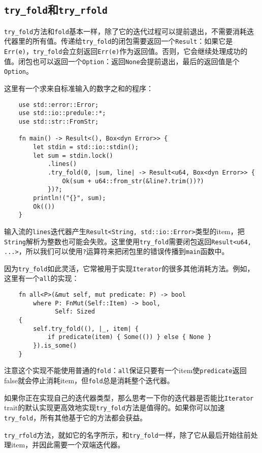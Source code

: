\subsection{\texttt{try\_fold}和\texttt{try\_rfold}}
\texttt{try\_fold}方法和\texttt{fold}基本一样，除了它的迭代过程可以提前退出，不需要消耗迭代器里的所有值。传递给\texttt{try\_fold}的闭包需要返回一个\texttt{Result}：如果它是\texttt{Err(e)}，\texttt{try\_fold}会立刻返回\texttt{Err(e)}作为返回值。否则，它会继续处理成功的值。闭包也可以返回一个\texttt{Option}：返回\texttt{None}会提前退出，最后的返回值是个\texttt{Option}。

这里有一个求来自标准输入的数字之和的程序：
\begin{verbatim}
    use std::error::Error;
    use std::io::predule::*;
    use std::str::FromStr;

    fn main() -> Result<(), Box<dyn Error>> {
        let stdin = std::io::stdin();
        let sum = stdin.lock()
            .lines()
            .try_fold(0, |sum, line| -> Result<u64, Box<dyn Error>> {
                Ok(sum + u64::from_str(&line?.trim())?)
            })?;
        println!("{}", sum);
        Ok(())
    }
\end{verbatim}

输入流的\texttt{lines}迭代器产生\texttt{Result<String, std::io::Error>}类型的item，把\texttt{String}解析为整数也可能会失败。这里使用\texttt{try\_fold}需要闭包返回\texttt{Result<u64, ...>}，所以我们可以使用\texttt{?}运算符来把闭包里的错误传播到\texttt{main}函数中。

因为\texttt{try\_fold}如此灵活，它常被用于实现\texttt{Iterator}的很多其他消耗方法。例如，这里有一个\texttt{all}的实现：
\begin{verbatim}
    fn all<P>(&mut self, mut predicate: P) -> bool
        where P: FnMut(Self::Item) -> bool,
              Self: Sized
    {
        self.try_fold((), |_, item| {
            if predicate(item) { Some(()) } else { None }
        }).is_some()
    }
\end{verbatim}

注意这个实现不能使用普通的\texttt{fold}：\texttt{all}保证只要有一个item使\texttt{predicate}返回false就会停止消耗item，但\texttt{fold}总是消耗整个迭代器。

如果你正在实现自己的迭代器类型，那么思考一下你的迭代器是否能比\texttt{Iterator} trait的默认实现更高效地实现\texttt{try\_fold}方法是值得的。如果你可以加速\texttt{try\_fold}，所有其他基于它的方法都会获益。

\texttt{try\_rfold}方法，就如它的名字所示，和\texttt{try\_fold}一样，除了它从最后开始往前处理item，并因此需要一个双端迭代器。

